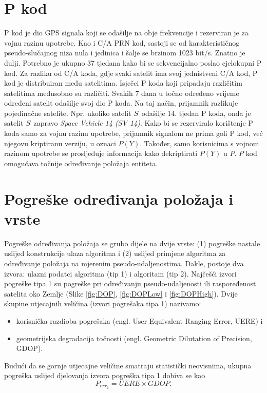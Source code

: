 \documentclass[a4paper,twoside,12pt]{memoir} %
\begin{document}
	
	\section{P kod}\label{Pkod}
	P kod je dio GPS signala koji se odašilje na obje frekvencije i rezerviran je za vojnu razinu upotrebe.
	Kao i C/A PRN kod, sastoji se od karakterističnog pseudo-slučajnog niza nula i jedinica i šalje se brzinom 1023 bit/s. Znatno je dulji.
	Potrebno je ukupno 37 tjedana kako bi se sekvencijalno poslao cjelokupni P kod.
	Za razliku od C/A koda, gdje svaki satelit ima svoj jednistveni C/A kod, P kod je
	distribuiran među satelitima. Isječci P koda koji pripadaju različitim satelitima međusobno su različiti.
	Svakih 7 dana u točno određeno vrijeme određeni satelit odašilje svoj dio P koda.
	Na taj način, prijamnik razlikuje pojedinačne satelite. Npr. ukoliko
	satelit $\mathnormal{S}$ odašilje 14. tjedan P koda, onda je satelit $\mathnormal{S}$
	zapravo \textit{Space Vehicle 14 (SV 14)}.
	Kako bi se rezerviralo korištenje P koda samo za vojnu razinu upotrebe,
	prijamnik signalom ne prima goli P kod, već njegovu kriptiranu verziju, u oznaci $P(Y)$.
	Također, samo korisnicima s vojnom razinom upotrebe se prosljeđuje informacija kako dekriptirati $P(Y)$ u $P$.
	$P$ kod omogućava točnije određivanje položaja entiteta.
	
	\section{Pogreške određivanja položaja i vrste}\label{sec:pogreske}
	Pogreške određivanja položaja se grubo dijele na dvije vrste: (1)
	pogreške nastale uslijed konstrukcije ulaza algoritma i
	(2) uslijed primjene algoritma za određivanje položaja na mjerenim pseudo-udaljenostima.
	Dakle, postoje dva izvora: ulazni podatci algoritma (tip 1) i algoritam (tip 2).
	Najčešći izvori pogreške tipa 1 su pogreške pri određivanju pseudo-udaljenosti
	ili raspoređenost satelita oko Zemlje (Slike \ref{fig:DOP}, \ref{fig:DOPLow} i \ref{fig:DOPHigh}).
	Dvije skupine utjecajnih veličina (izvori pogrešaka tipa 1) nazivamo:%
	\begin{itemize}
		\item korisnička razdioba pogrešaka (engl. User Equivalent Ranging Error, UERE) i 
		\item geometrijska degradacija točnosti (engl. Geometric Dilutation of Precision, GDOP).
	\end{itemize}
	Budući da se gornje utjecajne veličine smatraju statistički neovisnima, ukupna pogreška 
	uslijed djelovanja izvora pogreška tipa 1 dobiva se kao $$P_{err_1} = UERE \times GDOP.$$
	
\end{document}
